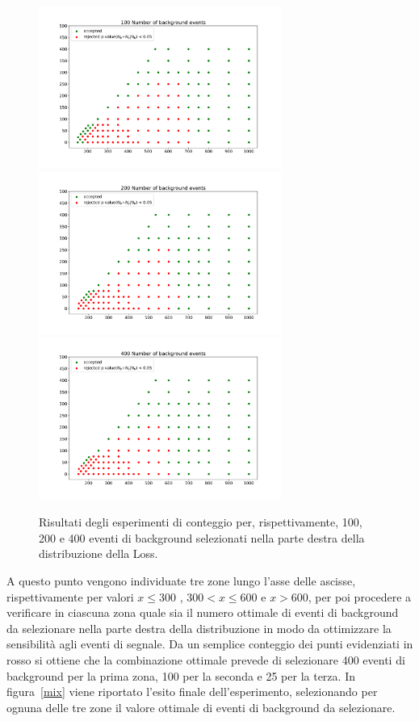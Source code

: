 \begin{figure}[h!]
	\centering
	\includegraphics[width=0.71\textwidth]{figs/risultati_simulazione/100.pdf}
	\includegraphics[width=0.71\textwidth]{figs/risultati_simulazione/200.pdf}
	\includegraphics[width=0.71\textwidth]{figs/risultati_simulazione/400.pdf}
	\caption{Risultati degli esperimenti di conteggio per, rispettivamente, 100, 200 e 400 eventi di background selezionati nella parte destra della distribuzione della Loss.}
	\label{test-100-200-400}
\end{figure}

A questo punto vengono individuate tre zone lungo l'asse delle ascisse, rispettivamente per valori $ x \le 300$ , $300 < x \le 600$ e $x > 600$, per poi procedere a verificare in ciascuna zona quale sia il numero ottimale di eventi di background da selezionare nella parte destra della distribuzione in modo da ottimizzare la sensibilità agli eventi di segnale. Da un semplice conteggio dei punti evidenziati in rosso si ottiene che la combinazione ottimale prevede di selezionare 400 eventi di background per la prima zona, 100 per la seconda e 25 per la terza. In figura~\ref{mix} viene riportato l'esito finale dell'esperimento, selezionando per ognuna delle tre zone il valore ottimale di eventi di background da selezionare.

